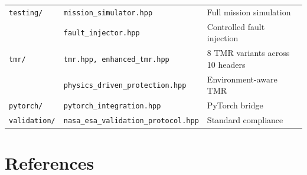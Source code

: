 \documentclass[11pt,a4paper]{article}
\begin{document}
\begin{table}[htbp]
\begin{tabular}{@{}lll@{}}
\texttt{testing/} & \texttt{mission\_simulator.hpp} & Full mission simulation \\
 & \texttt{fault\_injector.hpp} & Controlled fault injection \\
\texttt{tmr/} & \texttt{tmr.hpp, enhanced\_tmr.hpp} & 8 TMR variants across 10 headers \\
 & \texttt{physics\_driven\_protection.hpp} & Environment-aware TMR \\
\texttt{pytorch/} & \texttt{pytorch\_integration.hpp} & PyTorch bridge \\
\texttt{validation/} & \texttt{nasa\_esa\_validation\_protocol.hpp} & Standard compliance \\
\bottomrule
\end{tabular}
\end{table}

\newpage
\section*{References}
\end{document}
